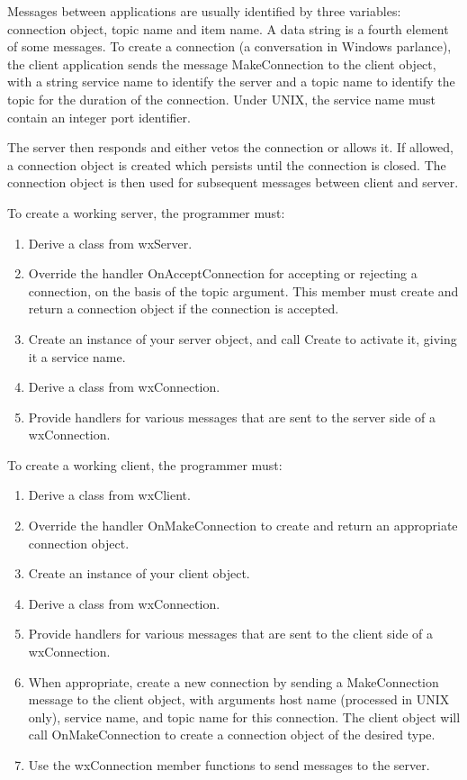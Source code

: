 Messages between applications are usually identified by three variables:
connection object, topic name and item name.  A data string is a fourth
element of some messages. To create a connection (a conversation in
Windows parlance), the client application sends the message
MakeConnection to the client object, with a string service name to
identify the server and a topic name to identify the topic for the
duration of the connection. Under UNIX, the service name must contain an
integer port identifier.

The server then responds and either vetos the connection or allows it.
If allowed, a connection object is created which persists until the
connection is closed.  The connection object is then used for subsequent
messages between client and server.

To create a working server, the programmer must:

\begin{enumerate}\itemsep=0pt
\item Derive a class from wxServer.
\item Override the handler OnAcceptConnection for accepting or rejecting a connection,
on the basis of the topic argument. This member must create and return a connection
object if the connection is accepted.
\item Create an instance of your server object, and call Create to
activate it, giving it a service name.
\item Derive a class from wxConnection.
\item Provide handlers for various messages that are sent to the server
side of a wxConnection.
\end{enumerate}

To create a working client, the programmer must:

\begin{enumerate}\itemsep=0pt
\item Derive a class from wxClient.
\item Override the handler OnMakeConnection to create and return
an appropriate connection object.
\item Create an instance of your client object.
\item Derive a class from wxConnection.
\item Provide handlers for various messages that are sent to the client
side of a wxConnection.
\item When appropriate, create a new connection by sending a MakeConnection
message to the client object, with arguments host name (processed in UNIX only),
service name, and topic name for this connection. The client object will call OnMakeConnection
to create a connection object of the desired type.
\item Use the wxConnection member functions to send messages to the server.
\end{enumerate}

